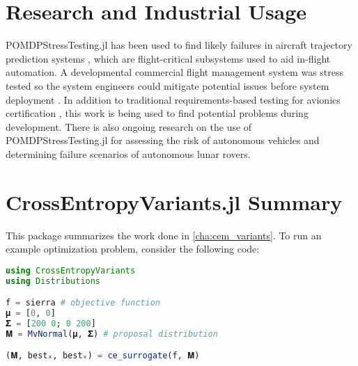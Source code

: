 \section{Research and Industrial Usage}

POMDPStressTesting.jl has been used to find likely failures in aircraft trajectory prediction systems \cite{ast_fms}, which are flight-critical subsystems used to aid in-flight automation.
A developmental commercial flight management system was stress tested so the system engineers could mitigate potential issues before system deployment \cite{ast_fms}.
In addition to traditional requirements-based testing for avionics certification \cite{do178c}, this work is being used to find potential problems during development.
There is also ongoing research on the use of POMDPStressTesting.jl for assessing the risk of autonomous vehicles and determining failure scenarios of autonomous lunar rovers. 





\section{CrossEntropyVariants.jl Summary}

This package summarizes the work done in \cref{cha:cem_variants}.
To run an example optimization problem, consider the following code:

\begin{lstlisting}[language=Julia]
using CrossEntropyVariants
using Distributions

f = sierra # objective function
𝛍 = [0, 0]
𝚺 = [200 0; 0 200]
𝐌 = MvNormal(𝛍, 𝚺) # proposal distribution

(𝐌, bestₓ, bestᵥ) = ce_surrogate(f, 𝐌)
\end{lstlisting}

